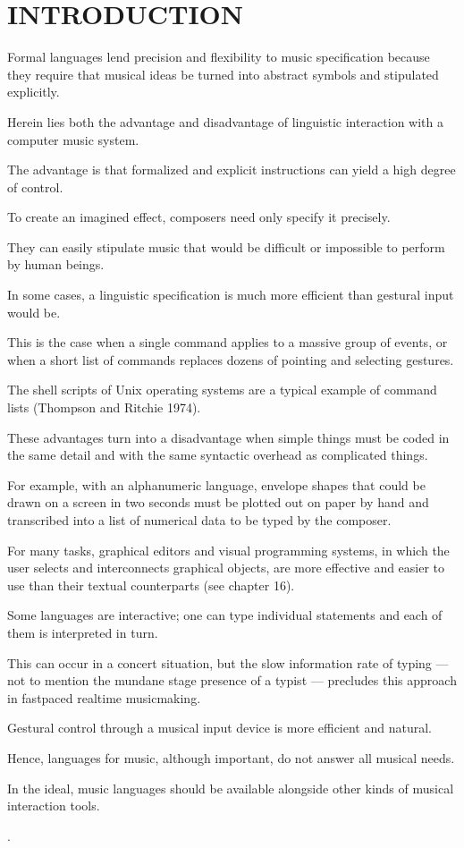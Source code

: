 
\chapter{INTRODUCTION}

Formal languages lend precision and flexibility to music specification because they require that musical ideas be turned into abstract symbols and stipulated explicitly.

Herein lies both the advantage and disadvantage of linguistic interaction with a computer music system.

The advantage is that formalized and explicit instructions can yield a high degree of control.

To create an imagined effect, composers need only specify it precisely.

They can easily stipulate music that would be difficult or impossible to perform by human beings.

In some cases, a linguistic specification is much more efficient than gestural input would be.

This is the case when a single command applies to a massive group of events, or when a short list of commands replaces dozens of pointing and selecting gestures.

The shell scripts of Unix operating systems are a typical example of command lists (Thompson and Ritchie 1974).

These advantages turn into a disadvantage when simple things must be coded in the same detail and with the same syntactic overhead as complicated things.

For example, with an alphanumeric language, envelope shapes that could be drawn on a screen in two seconds must be plotted out on paper by hand and transcribed into a list of numerical data to be typed by the composer.

For many tasks, graphical editors and visual programming systems, in which the user selects and interconnects graphical objects, are more effective and easier to use than their textual counterparts (see chapter 16).

Some languages are interactive; one can type individual statements and each of them is interpreted in turn.

This can occur in a concert situation, but the slow information rate of typing — not to mention the mundane stage presence of a typist — precludes this approach in fast­paced real­time music­making.

Gestural control through a musical input device is more efficient and natural.

Hence, languages for music, although important, do not answer all musical needs.

In the ideal, music languages should be available alongside other kinds of musical interaction tools.

\cite[785-786]{Roads1995}.